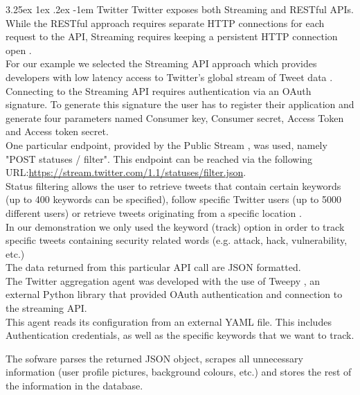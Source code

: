 \documentclass[12pt]{article}
\makeatletter
\renewcommand\paragraph{\@startsection{paragraph}{5}{\z@}%
  {3.25ex \@plus1ex \@minus.2ex}%
  {-1em}%
  {\normalfont\normalsize\bfseries}}
\makeatother
\begin{document}
\paragraph{Twitter}
\hfill \break
Twitter exposes both Streaming and RESTful APIs. While the RESTful approach requires separate HTTP connections for each request to the API, Streaming requires keeping a persistent HTTP connection open \cite{twitteroverview}.
\hfill \break \\
For our example we selected the Streaming API approach which provides developers with low latency access to Twitter's global stream of Tweet data \cite{twitteroverview}.
\hfill \break \\
Connecting to the Streaming API requires authentication via an OAuth signature. To generate this signature the user has to register their application and generate four parameters named Consumer key, Consumer secret, Access Token and Access token secret.
\hfill \break \\
One particular endpoint, provided by the Public Stream \cite{twitterpublic}, was used, namely "POST statuses / filter". This endpoint can be reached via the following URL:\url{https://stream.twitter.com/1.1/statuses/filter.json}.
\hfill \break \\
Status filtering allows the user to retrieve tweets that contain certain keywords (up to 400 keywords can be specified), follow specific Twitter users (up to 5000 different users) or retrieve tweets originating from a specific location \cite{twitterfilter}.
\hfill \break \\
In our demonstration we only used the keyword (track) option in order to track specific tweets containing security related words (e.g. attack, hack, vulnerability, etc.)
\hfill \break \\
The data returned from this particular API call are JSON formatted.
\hfill \break \\
The Twitter aggregation agent was developed with the use of Tweepy \cite{tweepy}, an external Python library that provided OAuth authentication and connection to the streaming API.
\hfill \break \\
This agent reads its configuration from an external YAML file. This includes Authentication credentials, as well as the specific keywords that we want to track.
\hfill \break \\
\parbox{\linewidth}{
The sofware parses the returned JSON object, scrapes all unnecessary information (user profile pictures, background colours, etc.) and stores the rest of the information in the database.  
}
\end{document}
